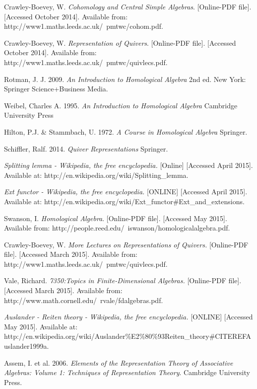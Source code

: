 \documentclass[11.5pt, twoside, a4paper, titlepage]{report}
\theoremstyle{definition}
\theoremstyle{plain}
\begin{document}
\begin{thebibliography}{99}

Crawley-Boevey, W.
\emph{Cohomology and Central Simple Algebras}. [Online-PDF file]. [Accessed October 2014].
Available from: http://www1.maths.leeds.ac.uk/~pmtwc/cohom.pdf.

Crawley-Boevey, W.
\emph{Representation of Quivers}. [Online-PDF file]. [Accessed October 2014].
Available from: http://www1.maths.leeds.ac.uk/~pmtwc/quivlecs.pdf.

Rotman, J. J.
2009.
\emph{An Introduction to Homological Algebra}
2nd ed.
New York: Springer Science+Business Media.

Weibel, Charles A.
1995.
\emph{An Introduction to Homological Algebra}
Cambridge University Press

Hilton, P.J. \& Stammbach, U.
1972.
\emph{A Course in Homological Algebra}
Springer.

Schiffler, Ralf.
2014.
\emph{Quiver Representations}
Springer.

\emph{Splitting lemma - Wikipedia, the free encyclopedia.} [Online]  [Accessed April 2015].
Available at: http://en.wikipedia.org/wiki/Splitting\_lemma.

\emph{Ext functor - Wikipedia, the free encyclopedia.} [ONLINE]  [Accessed April 2015].
Available at: http://en.wikipedia.org/wiki/Ext\_functor\#Ext\_and\_extensions.

Swanson, I.
\emph{Homological Algebra}. [Online-PDF file]. [Accessed May 2015].
Available from: http://people.reed.edu/~iswanson/homologicalalgebra.pdf.

Crawley-Boevey, W.
\emph{More Lectures on Representations of Quivers.} [Online-PDF file]. [Accessed March 2015].
Available from: http://www1.maths.leeds.ac.uk/~pmtwc/quivlecs.pdf.

Vale, Richard.
\emph{7350:Topics in Finite-Dimensional Algebras.} [Online-PDF file]. [Accessed March 2015].
Available from: http://www.math.cornell.edu/~rvale/fdalgebras.pdf.

\emph{Auslander - Reiten theory - Wikipedia, the free encyclopedia.} [ONLINE] [Accessed May 2015].
Available at: http://en.wikipedia.org/wiki/Auslander\%E2\%80\%93Reiten\_theory\#CITEREFAuslander1999a.

Assem, I. et al.
2006. 
\emph{Elements of the Representation Theory of Associative Algebras: Volume 1: Techniques of Representation Theory}.
Cambridge University Press.



\end{thebibliography}
\end{document}
